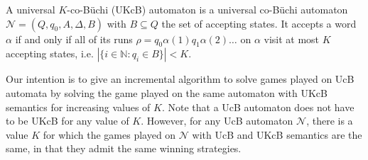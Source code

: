 \documentclass[runningheads,a4paper,draft]{llncs}
\newcommand{\calN}{\mathcal{N}}
\begin{document}
\begin{definition}
  A universal $K$-co-B\"uchi (UKcB) automaton is a universal co-Büchi automaton
  $\calN = (Q,q_0,A,\Delta,B)$ with $B \subseteq Q$ the set of accepting
  states.  It accepts a word $\alpha$ if and only if all of its runs
  $\rho = q_0 \alpha(1) q_1 \alpha(2) \dots$ on $\alpha$ visit at most $K$
  accepting states, i.e. $|\{i \in \mathbb{N} : q_i \in B\}| < K$.
\end{definition}

Our intention is to give an incremental algorithm to solve games played on UcB
automata by solving the game played on the same automaton with UKcB semantics
for increasing values of $K$.  Note that a UcB automaton does not have to be
UKcB for any value of \(K\).  However, for any UcB automaton \(\calN\), there is
a value \(K\) for which the games played on \(\calN\) with UcB and UKcB semantics
are the same, in that they admit the same winning strategies.
\end{document}
